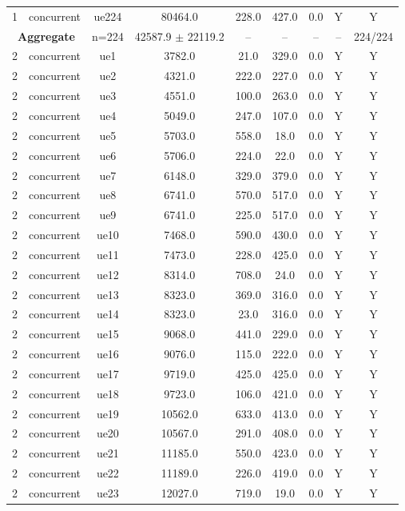 \begin{table}[ht]
\begin{tabular}{|c|c|c|c|c|c|c|c|c|}
1 & concurrent & ue224 & 80464.0 & 228.0 & 427.0 & 0.0 & Y & Y \\
\multicolumn{2}{|c|}{\textbf{Aggregate}} & n=224 & 42587.9 $\pm$ 22119.2 & -- & -- & -- & -- & 224/224 \\
\hline
2 & concurrent & ue1 & 3782.0 & 21.0 & 329.0 & 0.0 & Y & Y \\
2 & concurrent & ue2 & 4321.0 & 222.0 & 227.0 & 0.0 & Y & Y \\
2 & concurrent & ue3 & 4551.0 & 100.0 & 263.0 & 0.0 & Y & Y \\
2 & concurrent & ue4 & 5049.0 & 247.0 & 107.0 & 0.0 & Y & Y \\
2 & concurrent & ue5 & 5703.0 & 558.0 & 18.0 & 0.0 & Y & Y \\
2 & concurrent & ue6 & 5706.0 & 224.0 & 22.0 & 0.0 & Y & Y \\
2 & concurrent & ue7 & 6148.0 & 329.0 & 379.0 & 0.0 & Y & Y \\
2 & concurrent & ue8 & 6741.0 & 570.0 & 517.0 & 0.0 & Y & Y \\
2 & concurrent & ue9 & 6741.0 & 225.0 & 517.0 & 0.0 & Y & Y \\
2 & concurrent & ue10 & 7468.0 & 590.0 & 430.0 & 0.0 & Y & Y \\
2 & concurrent & ue11 & 7473.0 & 228.0 & 425.0 & 0.0 & Y & Y \\
2 & concurrent & ue12 & 8314.0 & 708.0 & 24.0 & 0.0 & Y & Y \\
2 & concurrent & ue13 & 8323.0 & 369.0 & 316.0 & 0.0 & Y & Y \\
2 & concurrent & ue14 & 8323.0 & 23.0 & 316.0 & 0.0 & Y & Y \\
2 & concurrent & ue15 & 9068.0 & 441.0 & 229.0 & 0.0 & Y & Y \\
2 & concurrent & ue16 & 9076.0 & 115.0 & 222.0 & 0.0 & Y & Y \\
2 & concurrent & ue17 & 9719.0 & 425.0 & 425.0 & 0.0 & Y & Y \\
2 & concurrent & ue18 & 9723.0 & 106.0 & 421.0 & 0.0 & Y & Y \\
2 & concurrent & ue19 & 10562.0 & 633.0 & 413.0 & 0.0 & Y & Y \\
2 & concurrent & ue20 & 10567.0 & 291.0 & 408.0 & 0.0 & Y & Y \\
2 & concurrent & ue21 & 11185.0 & 550.0 & 423.0 & 0.0 & Y & Y \\
2 & concurrent & ue22 & 11189.0 & 226.0 & 419.0 & 0.0 & Y & Y \\
2 & concurrent & ue23 & 12027.0 & 719.0 & 19.0 & 0.0 & Y & Y \\

\end{tabular}
\end{table}

